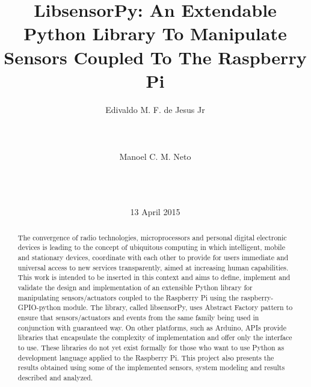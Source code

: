 \documentclass{acm_proc_article-sp}
\begin{document}
\thispagestyle{empty}

\title{LibsensorPy: An Extendable Python Library To Manipulate Sensors Coupled To The Raspberry Pi}

\author{
\alignauthor
Edivaldo M. F. de Jesus Jr\\
       \\
       \\
       \\
\alignauthor
Manoel C. M. Neto\\
       \\
       \\
       \\
}

\date{13 April 2015}

\maketitle
\begin{abstract}

The convergence of radio technologies, microprocessors and personal digital electronic devices is leading to the concept of ubiquitous computing in which intelligent, mobile and stationary devices, coordinate with each other to provide for users immediate and universal access to new services transparently, aimed at increasing human capabilities. This work is intended to be inserted in this context and aims to define, implement and validate the design and implementation of an extensible Python library for manipulating sensors/actuators coupled to the Raspberry Pi using the raspberry-GPIO-python module. The library, called libsensorPy, uses Abstract Factory pattern to ensure that sensors/actuators and events from the same family being used in conjunction with guaranteed way. On other platforms, such as Arduino, APIs provide libraries that encapsulate the complexity of implementation and offer only the interface to use. These libraries do not yet exist formally for those who want to use Python as development language applied to the Raspberry Pi. This project also presents the results obtained using some of the implemented sensors, system modeling and results described and analyzed.

\end{abstract}
\end{document}
